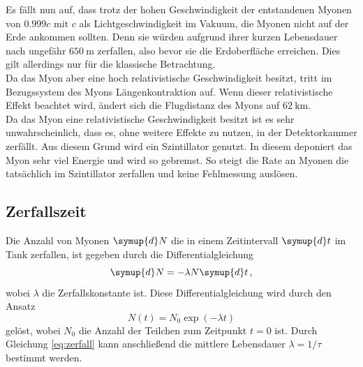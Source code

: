 Es fällt nun auf, dass trotz der hohen Geschwindigkeit der entstandenen Myonen von $0.999c$ mit $c$ als Lichtgeschwindigkeit im Vakuum, die Myonen nicht auf der Erde ankommen sollten.
Denn sie würden aufgrund ihrer kurzen Lebensdauer nach ungefähr $\SI{650}{\meter}$ zerfallen, also bevor sie die Erdoberfläche erreichen.
Dies gilt allerdings nur für die klassische Betrachtung.\\
Da das Myon aber eine hoch relativistische Geschwindigkeit besitzt, tritt im Bezugssystem des Myons Längenkontraktion auf.
Wenn dieser relativistische Effekt beachtet wird, ändert sich die Flugdistanz des Myons auf $\SI{62}{\kilo\meter}$. \\
Da das Myon eine relativistische Geschwindigkeit besitzt ist es sehr unwahrscheinlich, dass es, ohne weitere Effekte zu nutzen, in der Detektorkammer zerfällt.
Aus diesem Grund wird ein Szintillator genutzt.
In diesem deponiert das Myon sehr viel Energie und wird so gebremst. 
So steigt die Rate an Myonen die tatsächlich im Szintillator zerfallen und keine Fehlmessung auslösen.
\subsection{Zerfallszeit}
Die Anzahl von Myonen $\symup{d}N$ die in einem Zeitintervall $\symup{d}t$ im Tank zerfallen, ist gegeben durch die Differentialgleichung
\begin{equation*}
    \symup{d}N = -\lambda N \symup{d}t\, ,
\end{equation*}
wobei $\lambda$ die Zerfallskonstante ist.
Diese Differentialgleichung wird durch den Ansatz 
\begin{equation}
    N(t) = N_0 \exp(-\lambda t)
    \label{eq:zerfall}
\end{equation}
gelöst, wobei $N_0$ die Anzahl der Teilchen zum Zeitpunkt $t=0$ ist.
Durch Gleichung \eqref{eq:zerfall} kann anschließend die mittlere Lebensdauer $\lambda = 1/\tau$ bestimmt werden.
